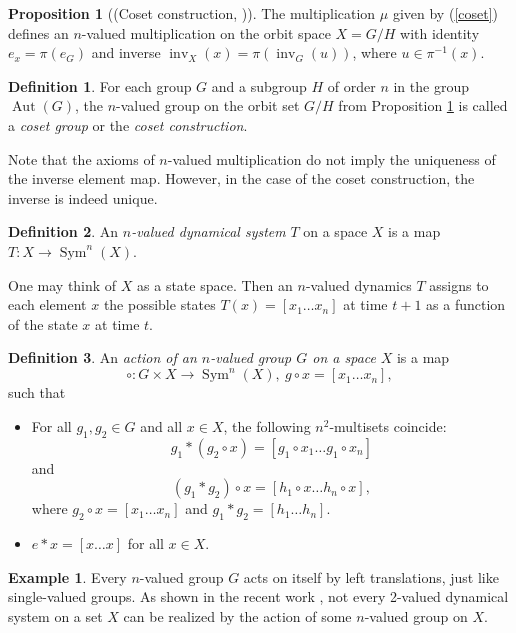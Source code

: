 \documentclass[14pt, dvipsnames]{extarticle}
\theoremstyle{definition}
\newtheorem{prop}{Proposition}
\theoremstyle{definition}
\newtheorem{defi}{Definition}
\newtheorem{example}{\bf Example}
\theoremstyle{remark}
\DeclareMathOperator{\Sym}{\mathrm{Sym}}
\DeclareMathOperator{\inv}{\mathrm{inv}}
\DeclareMathOperator{\Aut}{\mathrm{Aut}}
\begin{document}
\begin{prop}[(Coset construction, \cite{Buchstaber})]\label{coset_theorem}
The multiplication $\mu$ given by {\normalfont (\ref{coset})} defines an $n$-valued multiplication on the orbit space $X = G/H$ with identity $e_x = \pi(e_G)$ and inverse $\inv_X(x) = \pi(\inv_G(u))$, where $u\in\pi^{-1}(x)$.
\end{prop}

\begin{defi}\label{coset_defi}
For each group $G$ and a subgroup $H$ of order $n$ in the group $\Aut(G)$, the $n$-valued group on the orbit set $G/H$ from Proposition \ref{coset_theorem} is called a {\it coset group} or the {\it coset construction}.
\end{defi}

Note that the axioms of $n$-valued multiplication do not imply the uniqueness of the inverse element map. However, in the case of the coset construction, the inverse is indeed unique.

\begin{defi}
An {\it $n$-valued dynamical system} $T$ on a space $X$ is a map $T: X\to \Sym^n(X)$.
\end{defi}

One may think of $X$ as a state space. Then an $n$-valued dynamics $T$ assigns to each element $x$ the possible states $T(x) = [x_1\dots x_n]$ at time $t+1$ as a function of the state $x$ at time $t$.

\begin{defi}\label{group_action}
An {\it action of an $n$-valued group $G$ on a space} $X$ is a map
$$\circ: G\times X\to \Sym^n(X),\ g\circ x = [x_1\dots x_n],$$
such that

\begin{itemize}

\item For all $g_1, g_2\in G$ and all $x\in X$, the following $n^2$-multisets coincide:
$$g_1\ast(g_2\circ x) = [g_1\circ x_1\dots g_1\circ x_n]$$
and
$$(g_1\ast g_2)\circ x = [h_1\circ x\dots h_n\circ x],$$
where $g_2\circ x = [x_1\dots x_n]$ and $g_1\ast g_2 = [h_1\dots h_n]$.

\item $e\ast x = [x\dots x]$ for all $x\in X$.

\end{itemize}

\end{defi}

\begin{example}
Every $n$-valued group $G$ acts on itself by left translations, just like single-valued groups. As shown in the recent work \cite{Posadskiy}, not every 2-valued dynamical system on a set $X$ can be realized by the action of some $n$-valued group on $X$.
\end{example}
\end{document}
